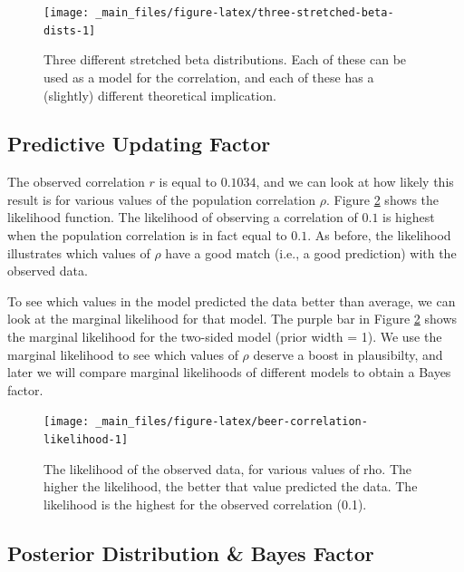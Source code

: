 \documentclass[
]{book}
\begin{document}
\begin{figure}

{\centering \texttt{[image: \_main\_files/figure-latex/three-stretched-beta-dists-1]} 

}

\caption{Three different stretched beta distributions. Each of these can be used as a model for the correlation, and each of these has a (slightly) different theoretical implication.}\label{fig:three-stretched-beta-dists}
\end{figure}

\hypertarget{predictive-updating-factor-1}{%
\subsection{Predictive Updating Factor}\label{predictive-updating-factor-1}}

The observed correlation \(r\) is equal to \(0.1034\), and we can look at how likely this result is for various values of the population correlation \(\rho\). Figure \ref{fig:beer-correlation-likelihood} shows the likelihood function. The likelihood of observing a correlation of \(0.1\) is highest when the population correlation is in fact equal to \(0.1\). As before, the likelihood illustrates which values of \(\rho\) have a good match (i.e., a good prediction) with the observed data.

To see which values in the model predicted the data better than average, we can look at the marginal likelihood for that model. The purple bar in Figure \ref{fig:beer-correlation-likelihood} shows the marginal likelihood for the two-sided model (prior width = 1). We use the marginal likelihood to see which values of \(\rho\) deserve a boost in plausibilty, and later we will compare marginal likelihoods of different models to obtain a Bayes factor.

\begin{figure}

{\centering \texttt{[image: \_main\_files/figure-latex/beer-correlation-likelihood-1]} 

}

\caption{The likelihood of the observed data, for various values of rho. The higher the likelihood, the better that value predicted the data. The likelihood is the highest for the observed correlation (0.1).}\label{fig:beer-correlation-likelihood}
\end{figure}

\hypertarget{posterior-distribution-bayes-factor-1}{%
\subsection{Posterior Distribution \& Bayes Factor}\label{posterior-distribution-bayes-factor-1}}
\end{document}
